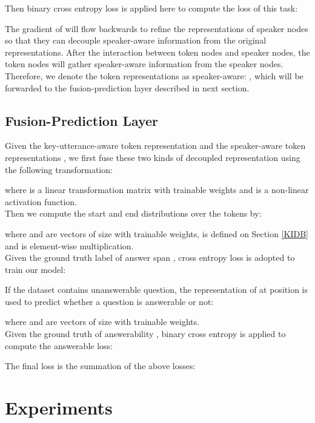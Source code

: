 \documentclass[11pt]{article}
\begin{document}
	Then binary cross entropy loss is applied here to compute the loss of this task:
	
	The gradient of  will flow backwards to refine the representations of speaker nodes so that they can decouple speaker-aware information from the original representations. After the interaction between token nodes and speaker nodes, the token nodes will gather speaker-aware information from the speaker nodes. Therefore, we denote the token representations as speaker-aware: , which will be forwarded to the fusion-prediction layer described in next section.
	
	
	\subsection{Fusion-Prediction Layer}
	\label{FPL}
	Given the key-utterance-aware token representation  and the speaker-aware token representations , we first fuse these two kinds of decoupled representation using the following transformation:
	
	where  is a linear transformation matrix with trainable weights and  is a non-linear activation function.\\
	Then we compute the start and end distributions over the tokens by:
	
	where  and  are vectors of size  with trainable weights,  is defined on Section \ref{KIDB} and  is element-wise multiplication.\\
	Given the ground truth label of answer span , cross entropy loss is adopted to train our model:
	
	
	If the dataset contains unanswerable question, the representation of  at  position  is used to predict whether a question is answerable or not:
	
	where  and  are vectors of size  with trainable weights.\\
	Given the ground truth of answerability , binary cross entropy is applied to compute the answerable loss:
	
	
	The final loss is the summation of the above losses:
	
	
	
	\section{Experiments}
\end{document}
